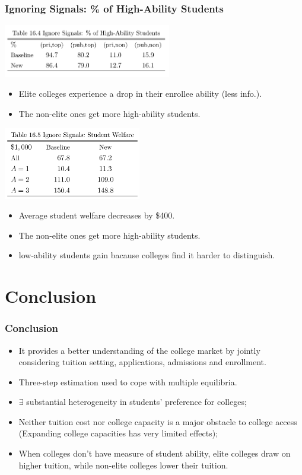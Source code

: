 \documentclass[10pt]{beamer}
\begin{document}
\begin{frame}[c]\frametitle{Ignoring Signals: \% of High-Ability Students}

\centerline{\includegraphics[width=0.55\textwidth]{table164.png}}
\begin{itemize}
    \small
    \item  Elite colleges experience a drop in their enrollee ability (less info.).
    \item  The non-elite ones get more high-ability students.
\end{itemize}
\centerline{\includegraphics[width=0.45\textwidth]{table165.png}}
\begin{itemize}
    \small
    \item  Average student welfare decreases by \$400.
    \item  The non-elite ones get more high-ability students.
    \item  low-ability students gain bacause colleges find it harder to distinguish.
\end{itemize}

\end{frame}

\section{Conclusion}
\begin{frame}[c]\frametitle{Conclusion}

\begin{itemize}
    \item It provides a better understanding of the college market by jointly considering tuition setting, applications, admissions and enrollment.
    \item Three-step estimation used to cope with multiple equilibria.
    \item $\exists$ substantial heterogeneity in students' preference for colleges;
    \item Neither tuition cost nor college capacity is a major obstacle to college access (Expanding college capacities has very limited effects);
    \item  When colleges don't have measure of student ability, elite colleges draw on higher tuition, while non-elite colleges lower their tuition.
\end{itemize}


\end{frame}
\end{document}
